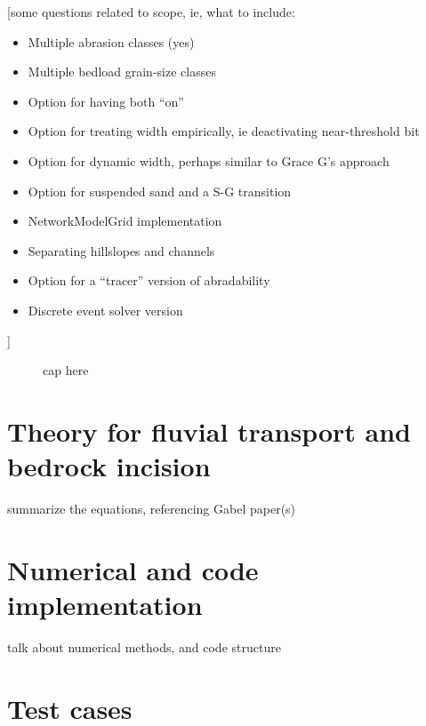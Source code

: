 \documentclass[journal abbreviation, manuscript]{copernicus}
\begin{document}
[some questions related to scope, ie, what to include:
\begin{itemize}
    \item Multiple abrasion classes (yes)
    \item Multiple bedload grain-size classes
    \item Option for having both ``on''
    \item Option for treating width empirically, ie deactivating near-threshold bit
    \item Option for dynamic width, perhaps similar to Grace G's approach
    \item Option for suspended sand and a S-G transition
    \item NetworkModelGrid implementation
    \item Separating hillslopes and channels
    \item Option for a ``tracer'' version of abradability
    \item Discrete event solver version
\end{itemize}]




\begin{figure}[h!]
\centering
\caption{cap here}
\label{fig:somefig}
\end{figure}



\section{Theory for fluvial transport and bedrock incision}

summarize the equations, referencing Gabel paper(s)

\section{Numerical and code implementation}

talk about numerical methods, and code structure

\section{Test cases}
\end{document}
